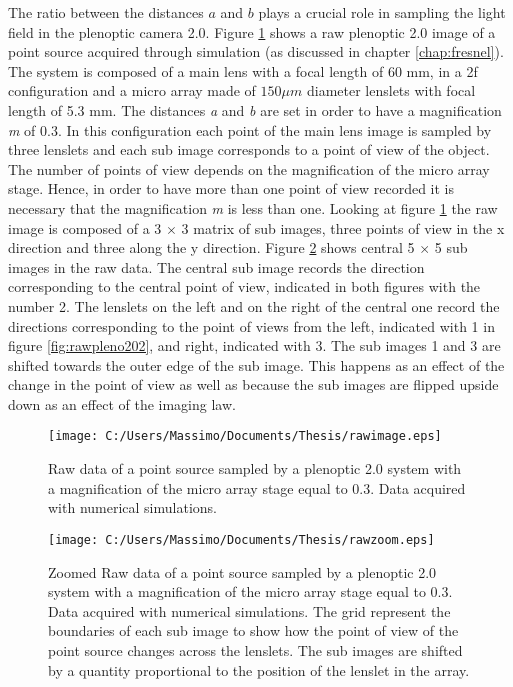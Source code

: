  The ratio between the distances $a$ and $b$ plays a crucial role in sampling the light field in the plenoptic camera 2.0. Figure \ref{fig:rawpleno20} shows a raw plenoptic 2.0 image of a point source acquired through simulation (as discussed in chapter \ref{chap:fresnel}). The system is composed of a main lens with a focal length of 60 mm, in a 2f configuration and a micro array made of $150 \mu m$ diameter lenslets with focal length of 5.3 mm. The distances \textit{a} and \textit{b} are set in order to have a magnification \textit{m} of 0.3. In this configuration each point of the main lens image is sampled by three lenslets and each sub image corresponds to a point of view of the object. The number of points of view depends on the magnification of the micro array stage. Hence, in order to have more than one point of view recorded it is necessary that the magnification \textit{m} is less than one. Looking at figure \ref{fig:rawpleno20} the raw image is composed of a 3 $\times$ 3 matrix of sub images, three points of view in the x direction and three along the y direction. Figure \ref{fig:rawpleno203} shows central 5 $\times$ 5 sub images in the raw data. The central sub image records the direction corresponding to the central point of view, indicated in both figures with the number 2. The lenslets on the left and on the right of the central one record the directions corresponding to the point of views from the left, indicated with 1 in figure \ref{fig:rawpleno202}, and right, indicated with 3. The sub images 1 and 3 are shifted towards the outer edge of the sub image. This happens as an effect of the change in the point of view as well as because the sub images are flipped upside down as an effect of the imaging law.
  \begin{figure}[H]
 	\centering
 	\texttt{[image: C:/Users/Massimo/Documents/Thesis/rawimage.eps]}
 	\caption{\label{fig:rawpleno20} Raw data of a point source sampled by a plenoptic 2.0 system with a magnification of the micro array stage equal to 0.3. Data acquired with numerical simulations. }
 \end{figure}
 \begin{figure}[H]
 	\centering
 	\texttt{[image: C:/Users/Massimo/Documents/Thesis/rawzoom.eps]}
 	\caption{\label{fig:rawpleno203} Zoomed Raw data of a point source sampled by a plenoptic 2.0 system with a magnification of the micro array stage equal to 0.3. Data acquired with numerical simulations. The grid represent the boundaries of each sub image to show how the point of view of the point source changes across the lenslets. The sub images are shifted by a quantity proportional to the position of the lenslet in the array.  }
 \end{figure}
